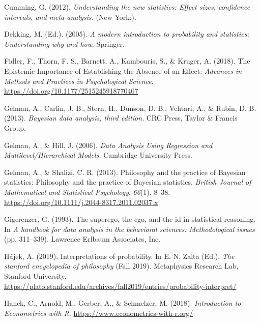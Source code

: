 \documentclass[
  a4paper,11pt,twoside,onecolumn,openright,final,oldfontcommands]{memoir}
\newlength{\cslhangindent}
\newlength{\cslentryspacingunit} %
\newenvironment{CSLReferences}[2] %
 {%
  \setlength{\parindent}{0pt}
  \ifodd #1
  \let\oldpar\par
  \def\par{\hangindent=\cslhangindent\oldpar}
  \fi
  \setlength{\parskip}{#2\cslentryspacingunit}
 }%
 {}
\theoremstyle{definition}
\theoremstyle{definition}
\theoremstyle{definition}
\theoremstyle{definition}
\theoremstyle{remark}
\begin{document}
\begin{CSLReferences}{1}{0}
\leavevmode{}%
Cumming, G. (2012). \emph{Understanding the new statistics: {Effect} sizes, confidence intervals, and meta-analysis.} (New York:).

\leavevmode{}%
Dekking, M. (Ed.). (2005). \emph{A modern introduction to probability and statistics: Understanding why and how}. Springer.

\leavevmode{}%
Fidler, F., Thorn, F. S., Barnett, A., Kambouris, S., \& Kruger, A. (2018). The {Epistemic} {Importance} of {Establishing} the {Absence} of an {Effect}: \emph{Advances in Methods and Practices in Psychological Science}. \url{https://doi.org/10.1177/2515245918770407}

\leavevmode{}%
Gelman, A., Carlin, J. B., Stern, H., Dunson, D. B., Vehtari, A., \& Rubin, D. B. (2013). \emph{Bayesian data analysis, third edition}. CRC Press, Taylor \& Francis Group.

\leavevmode{}%
Gelman, A., \& Hill, J. (2006). \emph{Data {Analysis} {Using} {Regression} and {Multilevel}/{Hierarchical} {Models}.} Cambridge University Press.

\leavevmode{}%
Gelman, A., \& Shalizi, C. R. (2013). Philosophy and the practice of {Bayesian} statistics: {Philosophy} and the practice of {Bayesian} statistics. \emph{British Journal of Mathematical and Statistical Psychology}, \emph{66}(1), 8--38. \url{https://doi.org/10.1111/j.2044-8317.2011.02037.x}

\leavevmode{}%
Gigerenzer, G. (1993). The superego, the ego, and the id in statistical reasoning. In \emph{A handbook for data analysis in the behavioral sciences: {Methodological} issues} (pp. 311--339). Lawrence Erlbaum Associates, Inc.

\leavevmode{}%
Hájek, A. (2019). Interpretations of probability. In E. N. Zalta (Ed.), \emph{The stanford encyclopedia of philosophy} (Fall 2019). Metaphysics Research Lab, Stanford University. \url{https://plato.stanford.edu/archives/fall2019/entries/probability-interpret/}

\leavevmode{}%
Hanck, C., Arnold, M., Gerber, A., \& Schmelzer, M. (2018). \emph{Introduction to {Econometrics} with {R}}. \url{https://www.econometrics-with-r.org/}


\end{CSLReferences}
\end{document}
